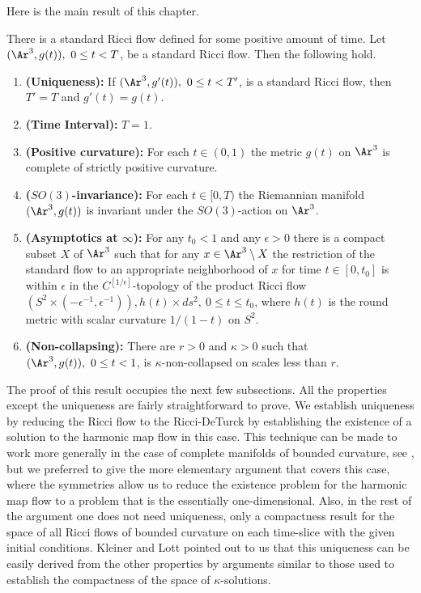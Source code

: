 Here is the main result of this chapter.

\begin{theorem}
\label{thm:standard-solution-existence-uniqueness}
\label{stdsoln}
There is a standard Ricci flow defined for some
positive amount of time. Let $(\Ar^3,g(t)),\ 0\le t<T$, be a
standard Ricci flow. Then the following hold.
\begin{enumerate}
\item[(1)] {\bf (Uniqueness):}
If $(\Ar^3,g'(t)),\ 0\le t<T'$, is a standard Ricci flow, then
$T'=T$ and $g'(t)=g(t)$.
\item[(2)] {\bf (Time Interval):} $T=1$.
\item[(3)] {\bf (Positive curvature):} For each $t\in (0,1)$ the metric $g(t)$ on $\Ar^3$ is complete
of strictly positive curvature.
\item[(4)] {\bf ($SO(3)$-invariance):} For each $t\in [0,T)$ the
Riemannian manifold $(\Ar^3,g(t))$  is invariant under the
$SO(3)$-action on $\Ar^3$.
\item[(5)] {\bf (Asymptotics at $\infty$):}
For any $t_0<1$ and any $\epsilon>0$ there is a compact subset $X$
of $\Ar^3$ such that for any $x\in \Ar ^3\setminus X$ the
restriction of the standard flow to an appropriate neighborhood of
$x$ for time $t\in [0,t_0]$ is within $\epsilon$ in the
$C^{[1/\epsilon]}$-topology of the product Ricci flow $(S^2\times
(-\epsilon^{-1},\epsilon^{-1})),h(t)\times ds^2,\ 0\le t\le t_0$,
where $h(t)$ is the round metric with scalar curvature $1/(1-t)$ on
$S^2$.
\item[(6)] {\bf (Non-collapsing):} There are $r>0$ and $\kappa>0$ such that $(\Ar^3,g(t)),\ 0\le
t<1$, is $\kappa$-non-collapsed on scales less than $r$.
\end{enumerate}
\end{theorem}

The proof of this result occupies the next few subsections. All the
properties except the uniqueness are fairly straightforward to
prove. We establish uniqueness by reducing the Ricci flow to the
Ricci-DeTurck by establishing the existence of a solution to the
harmonic map flow in this case. This technique can be made to work
more generally in the case of complete manifolds of bounded
curvature, see \cite{ChenZhu}, but we preferred to give the more
elementary argument that covers this case, where the symmetries
allow us to reduce the existence problem for the harmonic map flow
to a problem that is the essentially one-dimensional. Also, in the
rest of the argument one does not need uniqueness, only a
compactness result for the space of all Ricci flows of bounded
curvature on each time-slice with the given initial conditions.
Kleiner and Lott pointed out to us that this uniqueness can be
easily derived from the other properties by arguments similar to
those used to establish the compactness of the space of
$\kappa$-solutions.

